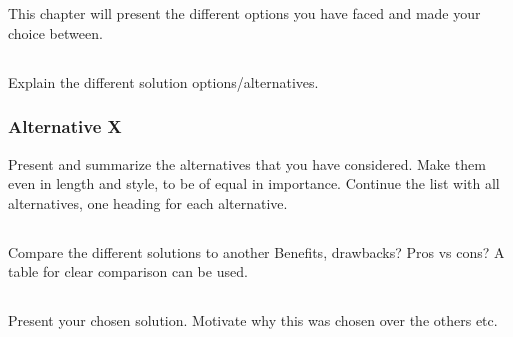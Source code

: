 \section{}\label{sec:prestudy} 
       
This chapter will present the different options you have faced and made your
choice between.

\subsection{}\label{subsec:solutionalt}
Explain the different solution options/alternatives.

\subsubsection{Alternative X}\label{subsubsec:altx}
Present and summarize the alternatives that you have considered. Make them even
in length and style, to be of equal in importance. Continue the list with all
alternatives, one heading for each alternative.

\subsection{}\label{subsec:comparesolution}
Compare the different solutions to another Benefits, drawbacks? Pros vs cons? A
table for clear comparison can be used.

\subsection{}\label{subsec:chosensolution}
Present your chosen solution. Motivate why this was chosen over the others etc.\

